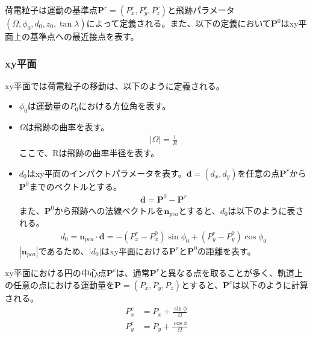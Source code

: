 荷電粒子は運動の基準点$\mathbf{P}^r = \left( P_x^r, P_y^r, P_z^r \right)$と飛跡パラメータ$\left( \Omega, {\phi}_0, d_0, z_0, \tan \lambda \right)$によって定義される。また、以下の定義において$\mathbf{P}^0$はxy平面上の基準点への最近接点を表す。
\subsubsection{xy平面}
xy平面では荷電粒子の移動は、以下のように定義される。\cite{lcio}
\begin{itemize}
\item ${\phi}_0$は運動量の$P_0$における方位角を表す。\\
\item $\Omega$は飛跡の曲率を表す。\\
\begin{align}
|\Omega | = \frac{1}{R}
\end{align}
ここで、Rは飛跡の曲率半径を表す。\\
\item $d_0$はxy平面のインパクトパラメータを表す。$\mathbf{d} = (d_x, d_y)$を任意の点$\mathbf{P}^r$から$\mathbf{P}^0$までのベクトルとする。\\
\begin{align}
\mathbf{d} = \mathbf{P}^0 - \mathbf{P}^r
\end{align}
また、$\mathbf{P}^0$から飛跡への法線ベクトルを$\mathbf{n}_{pca}$とすると、$d_0$は以下のように表される。
\begin{align}
d_0 = \mathbf{n}_{pca} \cdot \mathbf{d} = - ( P_x^r - P_x^0 ) \sin {\phi}_0 +  ( P_y^r - P_y^0 ) \cos {\phi}_0
\end{align}
$|\mathbf{n}_{pca}|$であるため、$|d_0|$はxy平面における$\mathbf{P}^r$と$\mathbf{P}^0$の距離を表す。
\end{itemize}
xy平面における円の中心点$\mathbf{P}^c$は、通常$\mathbf{P}^r$と異なる点を取ることが多く、軌道上の任意の点における運動量を$\mathbf{P} = \left( P_x, P_y, P_z \right)$とすると、$\mathbf{P}^c$は以下のように計算される。
\begin{align}
P_x^c &= P_x + \frac{\sin \phi}{\Omega}\\
P_y^c &= P_y + \frac{\cos \phi}{\Omega}\\
\end{align}
